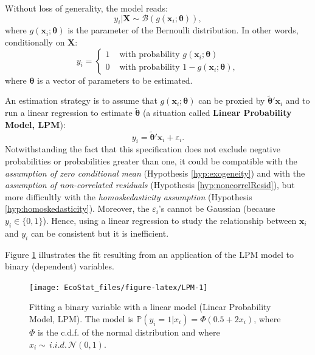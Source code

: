 \documentclass[
  12pt,
]{book}
\theoremstyle{definition}
\theoremstyle{definition}
\theoremstyle{definition}
\theoremstyle{definition}
\theoremstyle{remark}
\begin{document}
Without loss of generality, the model reads:
\begin{equation}\label{eq:binaryBenroulli}
y_i | \mathbf{X} \sim \mathcal{B}(g(\mathbf{x}_i;\boldsymbol\theta)),
\end{equation}
where \(g(\mathbf{x}_i;\boldsymbol\theta)\) is the parameter of the Bernoulli distribution. In other words, conditionally on \(\mathbf{X}\):
\begin{equation}
y_i = \left\{
\begin{array}{cl}
1 & \mbox{ with probability } g(\mathbf{x}_i;\boldsymbol\theta)\\
0 & \mbox{ with probability } 1-g(\mathbf{x}_i;\boldsymbol\theta),
\end{array}
\right.\label{eq:genericBinary}
\end{equation}
where \(\boldsymbol\theta\) is a vector of parameters to be estimated.

An estimation strategy is to assume that \(g(\mathbf{x}_i;\boldsymbol\theta)\) can be proxied by \(\tilde{\boldsymbol\theta}'\mathbf{x}_i\) and to run a linear regression to estimate \(\tilde{\boldsymbol\theta}\) (a situation called \textbf{Linear Probability Model, LPM}):
\[
y_i = \tilde{\boldsymbol\theta}'\mathbf{x}_i + \varepsilon_i.
\]
Notwithstanding the fact that this specification does not exclude negative probabilities or probabilities greater than one, it could be compatible with the \emph{assumption of zero conditional mean} (Hypothesis \ref{hyp:exogeneity}) and with the \emph{assumption of non-correlated residuals} (Hypothesis \ref{hyp:noncorrelResid}), but more difficultly with the \emph{homoskedasticity assumption} (Hypothesis \ref{hyp:homoskedasticity}). Moreover, the \(\varepsilon_i\)'s cannot be Gaussian (because \(y_i \in \{0,1\}\)). Hence, using a linear regression to study the relationship between \(\mathbf{x}_i\) and \(y_i\) can be consistent but it is inefficient.

Figure \ref{fig:LPM} illustrates the fit resulting from an application of the LPM model to binary (dependent) variables.

\begin{figure}
\texttt{[image: EcoStat\_files/figure-latex/LPM-1]} \caption{Fitting a binary variable with a linear model (Linear Probability Model, LPM). The model is $\mathbb{P}(y_i=1|x_i)=\Phi(0.5+2x_i)$, where $\Phi$ is the c.d.f. of the normal distribution and where $x_i \sim \,i.i.d.\,\mathcal{N}(0,1)$.}\label{fig:LPM}
\end{figure}
\end{document}
